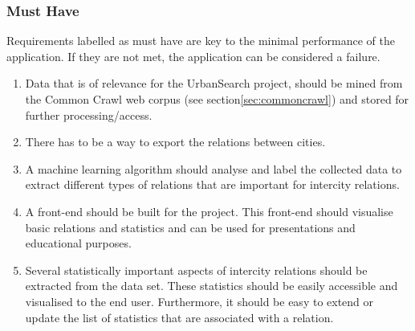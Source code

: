 \subsubsection{Must Have}
Requirements labelled as must have are key to the minimal performance of the application. If they are not met, the application can be considered a failure.

\begin{enumerate}
    \item Data that is of relevance for the UrbanSearch project, should be mined from the Common Crawl web corpus (see section\ref{sec:commoncrawl}) and stored for further processing/access.
    \item There has to be a way to export the relations between cities.
    \item A machine learning algorithm should analyse and label the collected data to extract different types of relations that are important for intercity relations.
    \item A front-end should be built for the project. This front-end should visualise basic relations and statistics and can be used for presentations and educational purposes.
    \item Several statistically important aspects of intercity relations should be extracted from the data set. These statistics should be easily accessible and visualised to the end user. Furthermore, it should be easy to extend or update the list of statistics that are associated with a relation.
\end{enumerate}

